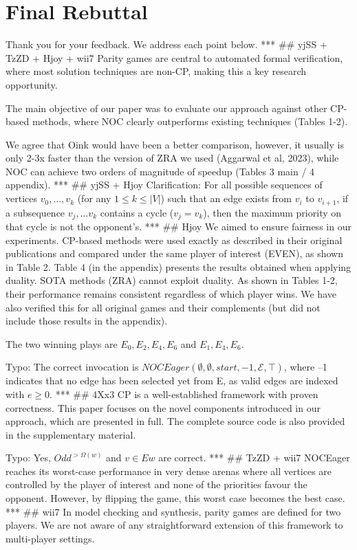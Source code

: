 \documentclass{article}
\begin{document}
\section{Final Rebuttal}

Thank you for your feedback. We address each point below.
***
## yjSS + TzZD + Hjoy + wii7
Parity games are central to automated formal verification, where most solution techniques are non-CP, making this a key research opportunity.

The main objective of our paper was to evaluate our approach against other CP-based methods, where NOC clearly outperforms existing techniques (Tables 1-2).

We agree that Oink would have been a better comparison, however, it usually is only 2-3x faster than the version of ZRA we used (Aggarwal et al, 2023), while NOC can achieve two orders of magnitude of speedup (Tables 3 main / 4 appendix).
***
## yjSS + Hjoy
Clarification: For all possible sequences of vertices $v_0,\ldots,v_k$ (for any $1\leq k\leq |V|$) such that an edge exists from $v_i$ to $v_{i+1}$, if a subsequence $v_j,\ldots v_k$ contains a cycle ($v_j=v_k$), then the maximum priority on that cycle is not the opponent's.
***
## Hjoy
We aimed to ensure fairness in our experiments. CP-based methods were used exactly as described in their original publications and compared under the same player of interest (EVEN), as shown in Table 2. Table 4 (in the appendix) presents the results obtained when applying duality. SOTA methods (ZRA) cannot exploit duality. As shown in Tables 1-2, their performance remains consistent regardless of which player wins. We have also verified this for all original games and their complements (but did not include those results in the appendix).

The two winning plays are $E_0,E_2,E_4,E_6$ and $E_1,E_4,E_6$.

Typo: The correct invocation is $NOCEager(\emptyset,\emptyset,start,-1,\mathcal{E},\top)$, where –1 indicates that no edge has been selected yet from E, as valid edges are indexed with $e \ge 0$.
***
## 4Xx3
CP is a well-established framework with proven correctness. This paper focuses on the novel components introduced in our approach, which are presented in full. The complete source code is also provided in the supplementary material.

Typo: Yes, $Odd^{>\Omega(w)}$ and $v \in Ew$ are correct.
***
## TzZD + wii7
NOCEager reaches its worst-case performance in very dense arenas where all vertices are controlled by the player of interest and none of the priorities favour the opponent. However, by flipping the game, this worst case becomes the best case.
***
## wii7
In model checking and synthesis, parity games are defined for two players. We are not aware of any straightforward extension of this framework to multi-player settings.
\end{document}
